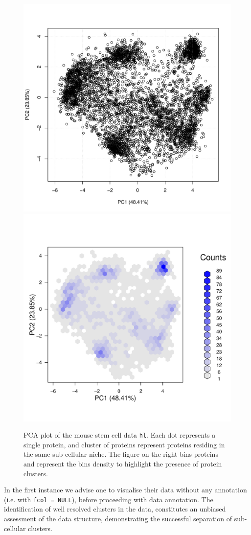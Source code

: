 \begin{figure}[!ht]
  \centering
\begin{knitrout}
\color{fgcolor}\begin{kframe}
\begin{alltt}
\hlstd{(}\hlstd{)}
  \hlstd{=} \hlstd{,}  \hlstd{=} \hlstd{)}
  \hlstd{=} \hlstd{)}
\end{alltt}
\end{kframe}
\includegraphics[width=.45\textwidth]{figure/qcplot-1} 
\includegraphics[width=.45\textwidth]{figure/qcplot-2} 

\end{knitrout}
\caption{PCA plot of the mouse stem cell data \texttt{hl}. Each dot
  represents a single protein, and cluster of proteins represent
  proteins residing in the same sub-cellular niche. The figure on the
  right bins proteins and represent the bins density to highlight the
  presence of protein clusters. }
  \label{fig:pcahl}
\end{figure}

In the first instance we advise one to visualise their data without
any annotation (i.e. with \texttt{fcol = NULL}), before proceeding with data
annotation. The identification of well resolved clusters in the data,
constitutes an unbiased assessment of the data structure,
demonstrating the successful separation of sub-cellular clusters.

